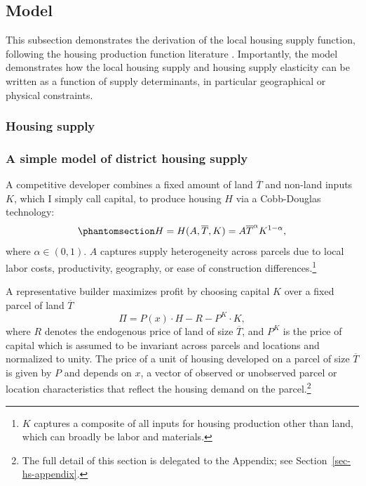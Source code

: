 \documentclass[
  12pt,
]{article}
\begin{document}
\subsection{Model}\label{model}

This subsection demonstrates the derivation of the local housing supply
function, following the housing production function literature
\citep{epple_etal_2010, combes_etal_2021}. Importantly, the model
demonstrates how the local housing supply and housing supply elasticity
can be written as a function of supply determinants, in particular
geographical or physical constraints.

\subsubsection{Housing supply}\label{housing-supply}

\subsubsection*{A simple model of district housing
supply}\label{a-simple-model-of-district-housing-supply}

A competitive developer combines a fixed amount of land \(\overline{T}\)
and non-land inputs \(K\), which I simply call capital, to produce
housing \(H\) via a Cobb-Douglas technology:
\begin{equation}\phantomsection\label{eq-cobb}{
H = H(A, \overline{T}, K) = A \overline{T}^{\alpha} K^{1-\alpha}, 
}\end{equation} where \(\alpha \in (0, 1)\). \(A\) captures supply
heterogeneity across parcels due to local labor costs, productivity,
geography, or ease of construction differences.\footnote{\(K\) captures
  a composite of all inputs for housing production other than land,
  which can broadly be labor and materials.}

A representative builder maximizes profit by choosing capital \(K\) over
a fixed parcel of land \(\overline{T}\) \[
\Pi = P(x) \cdot H - R - P^K \cdot K,
\] where \(R\) denotes the endogenous price of land of size
\(\overline{T}\), and \(P^K\) is the price of capital which is assumed
to be invariant across parcels and locations and normalized to unity.
The price of a unit of housing developed on a parcel of size
\(\overline{T}\) is given by \(P\) and depends on \(x\), a vector of
observed or unobserved parcel or location characteristics that reflect
the housing demand on the parcel.\footnote{The full detail of this
  section is delegated to the Appendix; see
  Section~\ref{sec-hs-appendix}.}
\end{document}
